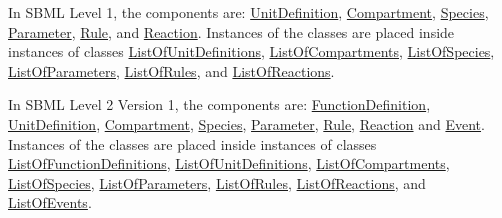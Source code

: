 \begin{DoxyItemize}
\item In S\+B\+ML Level 1, the components are\+: \hyperlink{class_unit_definition}{Unit\+Definition}, \hyperlink{class_compartment}{Compartment}, \hyperlink{class_species}{Species}, \hyperlink{class_parameter}{Parameter}, \hyperlink{class_rule}{Rule}, and \hyperlink{class_reaction}{Reaction}. Instances of the classes are placed inside instances of classes \hyperlink{class_list_of_unit_definitions}{List\+Of\+Unit\+Definitions}, \hyperlink{class_list_of_compartments}{List\+Of\+Compartments}, \hyperlink{class_list_of_species}{List\+Of\+Species}, \hyperlink{class_list_of_parameters}{List\+Of\+Parameters}, \hyperlink{class_list_of_rules}{List\+Of\+Rules}, and \hyperlink{class_list_of_reactions}{List\+Of\+Reactions}.


\item In S\+B\+ML Level 2 Version 1, the components are\+: \hyperlink{class_function_definition}{Function\+Definition}, \hyperlink{class_unit_definition}{Unit\+Definition}, \hyperlink{class_compartment}{Compartment}, \hyperlink{class_species}{Species}, \hyperlink{class_parameter}{Parameter}, \hyperlink{class_rule}{Rule}, \hyperlink{class_reaction}{Reaction} and \hyperlink{class_event}{Event}. Instances of the classes are placed inside instances of classes \hyperlink{class_list_of_function_definitions}{List\+Of\+Function\+Definitions}, \hyperlink{class_list_of_unit_definitions}{List\+Of\+Unit\+Definitions}, \hyperlink{class_list_of_compartments}{List\+Of\+Compartments}, \hyperlink{class_list_of_species}{List\+Of\+Species}, \hyperlink{class_list_of_parameters}{List\+Of\+Parameters}, \hyperlink{class_list_of_rules}{List\+Of\+Rules}, \hyperlink{class_list_of_reactions}{List\+Of\+Reactions}, and \hyperlink{class_list_of_events}{List\+Of\+Events}.



\end{DoxyItemize}

